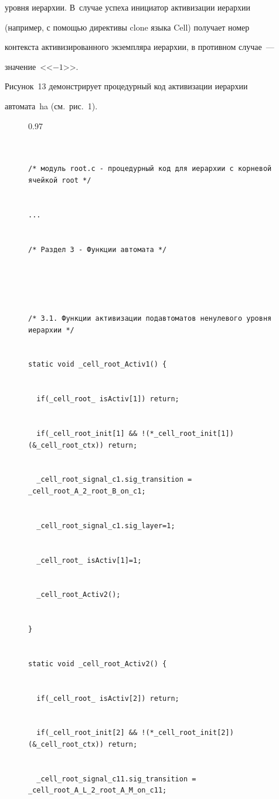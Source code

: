 уровня иерархии. В~случае успеха инициатор активизации иерархии 


(например, с помощью директивы {clone} языка Cell) получает номер 


контекста активизированного экземпляра иерархии, в противном случае~--- 


значение~<<$-1$>>.


      


      Рисунок~13 демонстрирует процедурный код активизации иерархии 


автомата~ha (см.\ рис.~1).


      


\begin{figure}\scriptsize %


\begin{center}


\begin{fmpage}{0.97\textwidth}


\begin{verbatim}


/* модуль root.c - процедурный код для иерархии с корневой ячейкой root */ 


... 


/* Раздел 3 - Функции автомата */ 


 


/* 3.1. Функции активизации подавтоматов ненулевого уровня иерархии */ 


static void _cell_root_Activ1() { 


  if(_cell_root_ isActiv[1]) return; 


  if(_cell_root_init[1] && !(*_cell_root_init[1])(&_cell_root_ctx)) return;  


  _cell_root_signal_c1.sig_transition = _cell_root_A_2_root_В_on_c1;


  _cell_root_signal_c1.sig_layer=1; 


  _cell_root_ isActiv[1]=1; 


  _cell_root_Activ2(); 


} 


static void _cell_root_Activ2() { 


  if(_cell_root_ isActiv[2]) return; 


  if(_cell_root_init[2] && !(*_cell_root_init[2])(&_cell_root_ctx)) return;  


  _cell_root_signal_c11.sig_transition = _cell_root_A_L_2_root_A_M_on_c11;



\end{verbatim}
\end{fmpage}
\end{center}
\end{figure}

